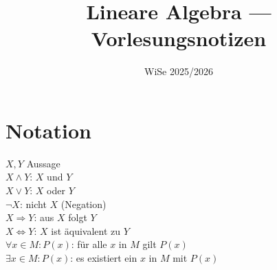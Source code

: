 \documentclass[a4paper,11pt,oneside]{scrartcl}
\title{Lineare Algebra --- Vorlesungsnotizen}
\date{WiSe 2025/2026}
\theoremstyle{plain}
\theoremstyle{definition}
\begin{document}
\maketitle
\newpage
{}
\setcounter{page}{1}
\tableofcontents
\newpage
\bigskip
{}
\setcounter{page}{1}


\section{Notation}
$X,Y$ Aussage \\
$X \land Y$: $X$ und $Y$ \\
$X \lor Y$: $X$ oder $Y$ \\
$\lnot X$: nicht $X$ (Negation) \\
$X \Rightarrow Y$: aus $X$ folgt $Y$ \\
$X \Leftrightarrow Y$: $X$ ist äquivalent zu $Y$ \\
$\forall x \in M: P(x)$: für alle $x$ in $M$ gilt $P(x)$ \\
$\exists x \in M: P(x)$: es existiert ein $x$ in $M$ mit $P(x)$ \\
\end{document}
